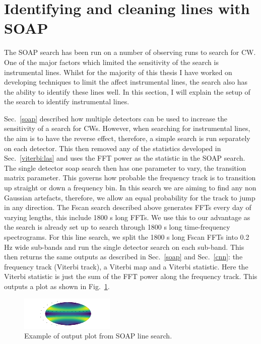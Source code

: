 \section{\label{detchar:soap}Identifying and cleaning lines with SOAP}

The SOAP search has been run on a number of observing runs to search for \ac{CW}. 
One of the major factors which limited the sensitivity of the search is instrumental lines. 
Whilst for the majority of this thesis I have worked on developing techniques to limit the affect instrumental lines, the search also has the ability to identify these lines well.
In this section, I will explain the setup of the search to identify instrumental lines.

Sec.~\ref{soap} described how multiple detectors can be used to increase the sensitivity of a search for \acp{CW}. 
However, when searching for instrumental lines, the aim is to have the reverse effect, therefore, a simple search is run separately on each detector. 
This then removed any of the statistics developed in Sec.~\ref{viterbi:las} and uses the \ac{FFT} power as the statistic in the SOAP search.
The single detector soap search then has one parameter to vary, the transition matrix parameter. 
This governs how probable the frequency track is to transition up straight or down a frequency bin.
In this search we are aiming to find any non Gaussian artefacts, therefore, we allow an equal probability for the track to jump in any direction. 
The Fscan search described above generates \acp{FFT} every day of varying lengths, this include 1800 s long \acp{FFT}. 
We use this to our advantage as the search is already set up to search through 1800 s long time-frequency spectrograms. 
For this line search, we split the 1800 s long Fscan \acp{FFT} into 0.2 Hz wide sub-bands and run the single detector search on each sub-band. 
This then returns the same outputs as described in Sec.~\ref{soap} and Sec.~\ref{cnn}: the frequency track (Viterbi track), a Viterbi map and a Viterbi statistic. 
Here the Viterbi statistic is just the sum of the \ac{FFT} power along the frequency track. 
This outputs a plot as shown in Fig.~\ref{detchar:soap:exampleplot}.
\begin{figure}
	\centering
	\includegraphics[width=\textwidth]{testimg.png}
	\caption{Example of output plot from SOAP line search.}
	\label{detchar:soap:exampleplot}
\end{figure}

